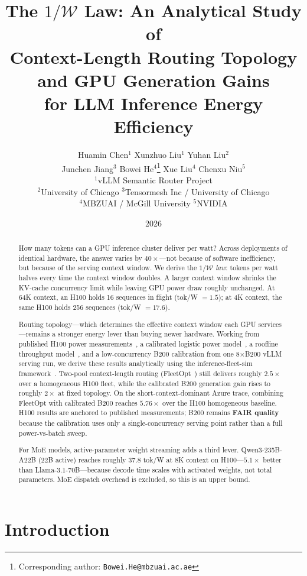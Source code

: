 \documentclass[11pt,a4paper]{article}
\title{%
  The $1/\mathcal{W}$ Law: An Analytical Study of\\
  Context-Length Routing Topology and GPU Generation Gains\\
  for LLM Inference Energy Efficiency%
}
\author{%
  Huamin Chen$^{1}$ \quad
  Xunzhuo Liu$^{1}$ \quad
  Yuhan Liu$^{2}$ \\[4pt]
  Junchen Jiang$^{3}$ \quad
  Bowei He$^{4}$\thanks{Corresponding author: \texttt{Bowei.He@mbzuai.ac.ae}} \quad
  Xue Liu$^{4}$
  Chenxu Niu$^{5}$
  \\[6pt]
  $^{1}$vLLM Semantic Router Project \\[1pt]
  $^{2}$University of Chicago \quad
  $^{3}$Tensormesh Inc / University of Chicago \\[1pt]
  $^{4}$MBZUAI / McGill University
  $^{5}$NVIDIA
}
\date{2026}
\begin{document}
\maketitle

\begin{abstract}
How many tokens can a GPU inference cluster deliver per watt?  Across
deployments of identical hardware, the answer varies by $40\times$---not
because of software inefficiency, but because of the serving context window.
We derive the $1/\mathcal{W}$ \emph{law}: tokens per watt halves every time
the context window doubles.  A larger context window shrinks the KV-cache
concurrency limit while leaving GPU power draw roughly unchanged.  At 64K
context, an H100 holds 16 sequences in flight (tok/W $= 1.5$); at 4K context,
the same H100 holds 256 sequences (tok/W $= 17.6$).

Routing topology---which determines the effective context window each GPU
services---remains a stronger energy lever than buying newer hardware.
Working from published H100 power measurements~\citep{chung2026mlenergy}, a
calibrated logistic power model~\citep{liang2026g2g}, a roofline throughput
model~\citep{xu2026aiconfigurator}, and a low-concurrency B200 calibration
from one 8$\times$B200 vLLM serving run, we derive these results analytically
using the inference-fleet-sim framework~\citep{chen2026fleetsim}.  Two-pool
context-length routing (FleetOpt~\citep{chen2026fleetopt}) still delivers
roughly $2.5\times$ over a homogeneous H100 fleet, while the calibrated B200
generation gain rises to roughly $2\times$ at fixed topology.  On the
short-context-dominant Azure trace, combining FleetOpt with calibrated B200
reaches $5.76\times$ over the H100 homogeneous baseline.  H100 results are
anchored to published measurements; B200 remains \textbf{FAIR quality} because
the calibration uses only a single-concurrency serving point rather than a full
power-vs-batch sweep.

For MoE models, active-parameter weight streaming adds a third lever.
Qwen3-235B-A22B (22B active) reaches roughly 37.8 tok/W at 8K context on
H100---$5.1\times$ better than Llama-3.1-70B---because decode time scales with
activated weights, not total parameters.  MoE dispatch overhead is excluded,
so this is an upper bound.
\end{abstract}

\section{Introduction}
\label{sec:intro}
\end{document}

